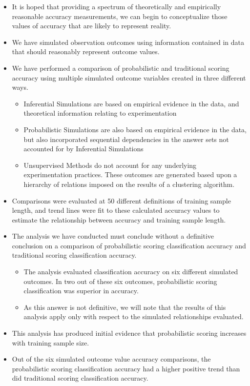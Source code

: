 \documentclass[12pt,]{article}
\providecommand{\tightlist}{%
  \setlength{\itemsep}{0pt}\setlength{\parskip}{0pt}}
\begin{document}
\begin{itemize}
\item
  It is hoped that providing a spectrum of theoretically and empirically
  reasonable accuracy measurements, we can begin to conceptualize those
  values of accuracy that are likely to represent reality.
\item
  We have simulated observation outcomes using information contained in
  data that should reasonably represent outcome values.
\item
  We have performed a comparison of probabilistic and traditional
  scoring accuracy using multiple simulated outcome variables created in
  three different ways.

  \begin{itemize}
  \tightlist
  \item
    Inferential Simulations are based on empirical evidence in the data,
    and theoretical information relating to experimentation
  \item
    Probabilistic Simulations are also based on empirical evidence in
    the data, but also incorporated sequential dependencies in the
    answer sets not accounted for by Inferential Simulations
  \item
    Unsupervised Methods do not account for any underlying
    experimentation practices. These outcomes are generated based upon a
    hierarchy of relations imposed on the results of a clustering
    algorithm.
  \end{itemize}
\item
  Comparisons were evaluated at 50 different definitions of training
  sample length, and trend lines were fit to these calculated accuracy
  values to estimate the relationship between accuracy and training
  sample length.
\item
  The analysis we have conducted must conclude without a definitive
  conclusion on a comparison of probabilistic scoring classification
  accuracy and traditional scoring classification accuracy.

  \begin{itemize}
  \tightlist
  \item
    The analysis evaluated classification accuracy on six different
    simulated outcomes. In two out of these six outcomes, probabilistic
    scoring classification was superior in accuracy.
  \item
    As this answer is not definitive, we will note that the results of
    this analysis apply only with respect to the simulated relationships
    evaluated.
  \end{itemize}
\item
  This analysis has produced initial evidence that probabilistic scoring
  increases with training sample size.
\item
  Out of the six simulated outcome value accuracy comparisons, the
  probabilistic scoring classification accuracy had a higher positive
  trend than did traditional scoring classification accuracy.


\end{itemize}
\end{document}
